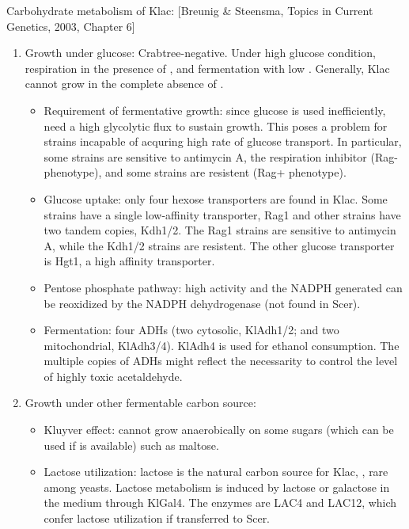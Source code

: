 \documentclass{report}
\begin{document}
Carbohydrate metabolism of Klac: [Breunig \& Steensma, Topics in Current Genetics, 2003, Chapter 6]
\begin{enumerate}
	\item Growth under glucose: Crabtree-negative. Under high glucose condition, respiration in the presence of , and fermentation with low . Generally, Klac cannot grow in the complete absence of . 
	\begin{itemize}
		\item Requirement of fermentative growth: since glucose is used inefficiently, need a high glycolytic flux to sustain growth. This poses a problem for strains incapable of acquring high rate of glucose transport. In particular, some strains are sensitive to antimycin A, the respiration inhibitor (Rag- phenotype), and some strains are resistent (Rag+ phenotype). 
		\item Glucose uptake: only four hexose transporters are found in Klac. Some strains have a single low-affinity transporter, Rag1 and other strains have two tandem copies, Kdh1/2. The Rag1 strains are sensitive to antimycin A, while the Kdh1/2 strains are resistent. The other glucose transporter is Hgt1, a high affinity transporter. 
		\item Pentose phosphate pathway: high activity and the NADPH generated can be reoxidized by the NADPH dehydrogenase (not found in Scer). 
		\item Fermentation: four ADHs (two cytosolic, KlAdh1/2; and two mitochondrial, KlAdh3/4). KlAdh4 is used for ethanol consumption. The multiple copies of ADHs might reflect the necessarity to control the level of highly toxic acetaldehyde. 
	\end{itemize}
	
	\item Growth under other fermentable carbon source: 
	\begin{itemize}
		\item Kluyver effect: cannot grow anaerobically on some sugars (which can be used if  is available) such as maltose. 
		\item Lactose utilization: lactose is the natural carbon source for Klac, , rare among yeasts. Lactose metabolism is induced by lactose or galactose in the medium through KlGal4. The enzymes are LAC4 and LAC12, which confer lactose utilization if transferred to Scer. 
	\end{itemize}
	

\end{enumerate}
\end{document}
